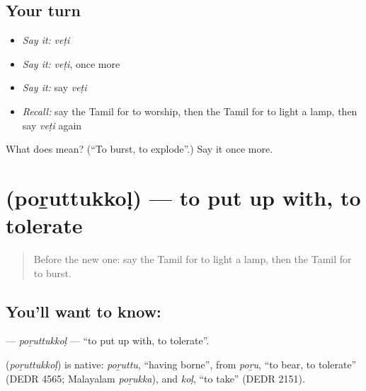 \subsection*{Your turn}
\begin{itemize}
\raggedright
  \item \emph{Say it:} \emph{veṭi}
  \item \emph{Say it:} \emph{veṭi}, once more
  \item \emph{Say it:} say \emph{veṭi}
  \item \emph{Recall:} say the Tamil for to worship, then the Tamil for to light a lamp, then say \emph{veṭi} again
\end{itemize}

\begin{tcolorbox}[breakable,colback=teal!4,colframe=teal!35!black,title={Before you move on}]
What does  mean? (\textquotedblleft{}To burst, to explode\textquotedblright{}.) Say it once more.
\end{tcolorbox}
\section[\texorpdfstring{\ta{பொறுத்துக்கொள்} (poṟuttukkoḷ)}{பொறுத்துக்கொள் (poṟuttukkoḷ)}]{ (poṟuttukkoḷ) — to put up with, to tolerate}

\label{lesson:TA-C166-poruttukkol}



\begin{quote}
Before the new one: say the Tamil for to light a lamp, then the Tamil for to burst.
\end{quote}

\subsection*{You'll want to know: }
\textbf{} — \emph{poṟuttukkoḷ} — \textquotedblleft{}to put up with, to tolerate\textquotedblright{}.

\begin{cousinweb}
\textbf{} (\emph{poṟuttukkoḷ}) is native: \emph{poṟuttu}, \textquotedblleft{}having borne\textquotedblright{}, from \emph{poṟu}, \textquotedblleft{}to bear, to tolerate\textquotedblright{} (DEDR 4565; Malayalam \emph{poṟukka}), and \emph{koḷ}, \textquotedblleft{}to take\textquotedblright{} (DEDR 2151).
\end{cousinweb}


